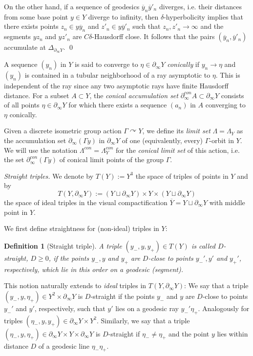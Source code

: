 \documentclass[12pt]{article}
\theoremstyle{boldplain}
\theoremstyle{bolddefinition}
\newtheorem{definition}[equation]{Definition}
\numberwithin{equation}{section}
\def\Ga{\Gamma}
\def\de{\delta}
\def\De{\Delta}
\def\La{\Lambda}
\def\acts{\curvearrowright}
\def\geo{\partial_{\infty}}
\def\geoc{\partial_{\infty}^{con}}
\def\Lac{\Lambda^{con}}
\def\LaY{\Lambda_Y}
\def\LaYc{\Lambda_Y^{con}}
\def\ol{\overline}
\begin{document}
On the other hand,
if a sequence of geodesics $\ol y_n\ol y'_n$ diverges,
i.e. their distances from some base point $y\in Y$ diverge to infinity,
then $\de$-hyperbolicity implies that there exists points $z_n\in y\ol y_n$ and $z'_n\in y\ol y'_n$
such that $z_n,z'_n\to\infty$ and the segments $yz_n$ and $yz'_n$ are $C\de$-Hausdorff close.
It follows that the pairs $(\ol y_n,\ol y'_n)$ accumulate at $\De_{\geo Y}$.
\qed

\medskip
A sequence $(y_n)$ in $Y$ is said to converge to $\eta\in \geo Y$ {\em conically} 
if $y_n\to \eta$ and $(y_n)$ is contained in a tubular neighborhood of a ray asymptotic to $\eta$.
This is independent of the ray since any two asymptotic rays have finite Hausdorff distance. 
For a subset $A\subset Y$,
the {\em conical accumulation set} $\geoc A\subset \geo Y$ 
consists of all points $\eta\in \geo Y$ for which there exists a sequence $(a_n)$ in $A$ converging to $\eta$ conically.


Given a discrete isometric group action $\Ga\acts Y$, we define its {\em limit set} $\La=\LaY$ as the accumulation set $\geo (\Ga y)$ in $\geo Y$ 
of one (equivalently, every) $\Ga$-orbit in $Y$. We will use the notation $\Lac=\LaYc$ for the {\em conical limit set} of this action, i.e. the set $\geoc (\Ga y)$ of conical limit points of the group $\Ga$.




\medskip 
{\em Straight triples.}
We denote by $T(Y):=Y^3$ the space of triples of points in $Y$ and by 
\begin{equation}
\label{eq:idtrpy}
T(Y, \geo Y):=(Y\sqcup\geo Y)\times Y\times (Y\sqcup\geo Y)
\end{equation}
the space of ideal triples in the visual compactification $\ol Y=Y\sqcup\geo Y$
with middle point in $Y$.

We first define straightness for (non-ideal) triples in $Y$:
\begin{definition}[Straight triple]
\label{def:strtrp}
A triple $(y_-,y,y_+)\in T(Y)$ is called {\em $D$-straight}, $D\geq0$, 
if the points $y_-,y$ and $y_+$ are $D$-close to points $y_-',y'$ and $y_+'$, respectively, 
which lie in this order on a geodesic (segment).
\end{definition}

This notion naturally extends to {\em ideal} triples in $T(Y, \geo Y)$:
We say that 
a triple $(y_-,y,\eta_+)\in Y^2\times\geo Y$ is $D$-straight 
if the points $y_-$ and $y$ are $D$-close to points $y_-'$ and $y'$, respectively,
such that $y'$ lies on a geodesic ray $y_-'\eta_+$.
Analogously for triples $(\eta_-,y,y_+)\in\geo Y\times Y^2$.
Similarly,
we say that 
a triple $(\eta_-,y,\eta_+)\in\geo Y\times Y\times\geo Y$ is $D$-straight 
if $\eta_-\neq\eta_+$ and the point $y$ lies within distance $D$ of a geodesic line $\eta_-\eta_+$.
\end{document}
